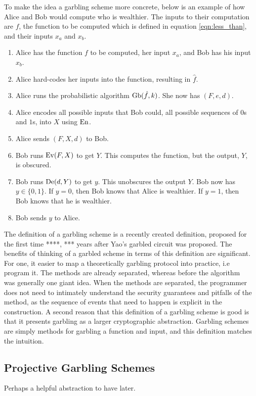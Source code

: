 \documentclass[12pt,twoside]{reedthesis}
\begin{document}
To make the idea a garbling scheme more concrete, below is an example of how Alice and Bob would compute who is wealthier. 
The inputs to their computation are $f$, the function to be computed which is defined in equation \ref{eqn:less_than}, and their inputs $x_a$ and $x_b$.
\begin{enumerate}
    \item Alice has the function $f$ to be computed, her input $x_a$, and Bob has his input $x_b$.
    \item Alice hard-codes her inputs into the function, resulting in $\hat{f}$.
    \item Alice runs the probabilistic algorithm $\operatorname{Gb}(\hat{f}, k)$. She now has $(F,e,d)$.
    \item Alice encodes all possible inputs that Bob could, all possible sequences of $0$s and $1$s, into $X$ using $\operatorname{En}$.
    \item Alice sends $(F,X,d)$ to Bob.
    \item Bob runs $\operatorname{Ev}(F,X)$ to get $Y$. This computes the function, but the output, $Y$, is obscured.
    \item Bob runs $\operatorname{De}(d,Y)$ to get $y$. This unobscures the output $Y$. Bob now has $y \in \{0,1\}$.
        If $y = 0$, then Bob knows that Alice is wealthier. 
        If $y = 1$, then Bob knows that he is wealthier.
    \item Bob sends $y$ to Alice.
\end{enumerate}

The definition of a garbling scheme is a recently created definition, proposed for the first time ****, *** years after Yao's garbled circuit was proposed.
The benefits of thinking of a garbled scheme in terms of this definition are significant.
For one, it easier to map a theoretically garbling protocol into practice, i.e program it. 
The methods are already separated, whereas before the algorithm was generally one giant idea.
When the methods are separated, the programmer does not need to intimately understand the security guarantees and pitfalls of the method, as the sequence of events that need to happen is explicit in the construction.
A second reason that this definition of a garbling scheme is good is that it presents garbling as a larger cryptographic abstraction. 
Garbling schemes are simply methods for garbling a function and input, and this definition matches the intuition. 

\subsection{Projective Garbling Schemes}
Perhaps a helpful abstraction to have later.
\end{document}
